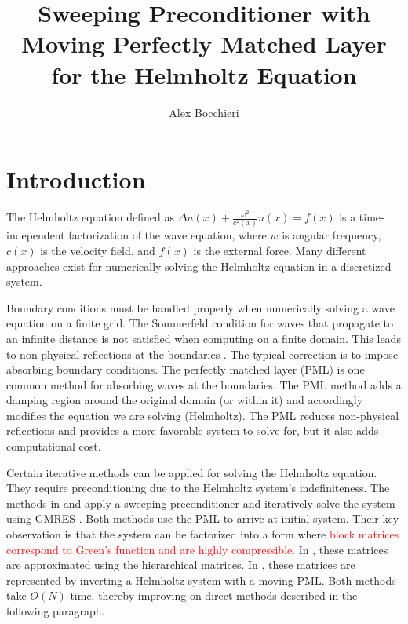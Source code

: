 \documentclass[11pt]{article}
\title{\vspace{-4.0cm}Sweeping Preconditioner with Moving Perfectly Matched Layer for the Helmholtz Equation}
\author{Alex Bocchieri}
\date{}
\begin{document}
\maketitle

\section{Introduction}
The Helmholtz equation defined as $\Delta u(x) + \frac{\omega^2}{c^2(x)}u(x)=f(x)$ 
is a time-independent factorization of the wave equation, where $w$ is angular 
frequency, $c(x)$ is the velocity field, and $f(x)$ is the external force. 
Many different approaches exist for numerically solving the Helmholtz equation 
in a discretized system. 

Boundary conditions must be handled properly when numerically solving a 
wave equation on a finite grid. The Sommerfeld condition for waves that propagate to an 
infinite distance is not satisfied when computing on a finite domain. This leads to 
non-physical reflections at the boundaries \cite{erlangga2008advances}. The typical 
correction is to impose absorbing boundary conditions. The perfectly matched layer (PML) 
\cite{berenger1994perfectly} is one common method for absorbing waves at the boundaries. 
The PML method adds a damping region around the original domain (or within it) and 
accordingly modifies the equation we are solving (Helmholtz). The PML reduces non-physical
reflections and provides a more favorable system to solve for, but it also adds
computational cost.

Certain iterative methods can be applied for solving the Helmholtz equation. They require 
preconditioning due to the Helmholtz system's indefiniteness. The methods in 
\cite{engquist2011pml} and \cite{engquist2011matrix} apply a sweeping preconditioner and
iteratively solve the system using GMRES \cite{saad1986gmres}. Both methods use the PML to arrive
at initial system. Their key observation is that the system can be factorized into a form
where \textcolor{red}{block matrices correspond to Green's function and are highly compressible.}
In \cite{engquist2011matrix}, these matrices are approximated using the hierarchical matrices. 
In \cite{engquist2011pml}, these matrices are represented by inverting a Helmholtz system with 
a moving PML. Both methods take $O(N)$ time, thereby improving on direct methods described in 
the following paragraph.
\end{document}
